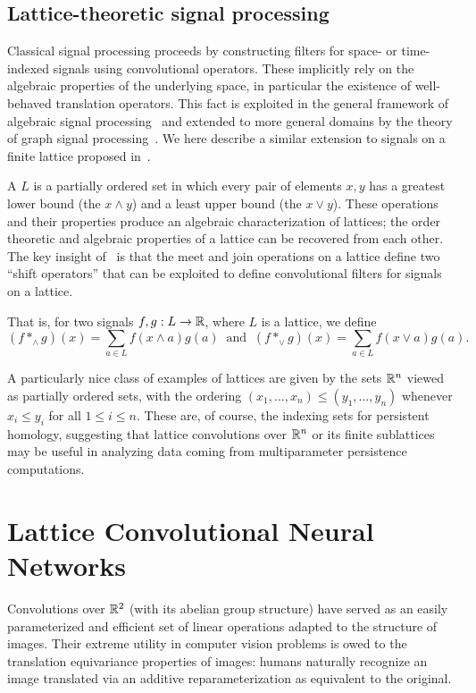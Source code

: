 \documentclass{article}
\begin{document}
\subsection{Lattice-theoretic signal processing}\label{sec:latticeconv}

Classical signal processing proceeds by constructing filters for space- or
time-indexed signals using convolutional operators. These implicitly rely on the
algebraic properties of the underlying space, in particular the existence of
well-behaved translation operators. This fact is exploited in the general
framework of algebraic signal processing~\cite{puschel_algebraic_2008} and
extended to more general domains by the theory of graph signal
processing~\cite{ortega_graph_2018}. We here describe a similar extension to
signals on a finite lattice proposed in~\cite{pueschel_discrete_2019}.

A  $L$ is a partially ordered set in which every pair of
elements $x,y$ has a greatest lower bound (the  $x \wedge y$)
and a least upper bound (the  $x \vee y$). These operations
and their properties produce an algebraic characterization of lattices; the
order theoretic and algebraic properties of a lattice can be recovered from each
other. The key insight of~\cite{pueschel_discrete_2019} is that the meet and
join operations on a lattice define two ``shift operators'' that can be
exploited to define convolutional filters for signals on a lattice.

That is, for two signals $f,g: L \to \mathbb{R}$, where $L$ is a lattice, we define
\[(f *_\wedge g)(x) = \sum_{a \in L}f(x\wedge a)g(a) \;\;\text{and}\;\; (f *_\vee g)(x) = \sum_{a \in L}f(x\vee a)g(a).\]

A particularly nice class of examples of lattices are given by the sets $\mathbb{R}^n$
viewed as partially ordered sets, with the ordering $(x_1,\ldots,x_n) \leq
(y_1,\ldots,y_n)$ whenever $x_i \leq y_i$ for all $1 \leq i \leq n$. These are,
of course, the indexing sets for persistent homology, suggesting that lattice
convolutions over $\mathbb{R}^n$ or its finite sublattices may be useful in analyzing
data coming from multiparameter persistence computations. 

\section{Lattice Convolutional Neural Networks}\label{sec:latticeCNN}

Convolutions over $\mathbb{R}^2$ (with its abelian group structure)
have served as an easily parameterized and efficient set of linear operations
adapted to the structure of images. Their extreme utility in computer vision
problems is owed to the translation equivariance properties of images: humans
naturally recognize an image translated via an additive reparameterization as
equivalent to the original.
\end{document}
